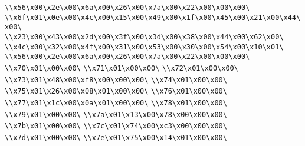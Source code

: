 \verb|\\x56\x00\x2e\x00\x6a\x00\x26\x00\x7a\x00\x22\x00\x00\x00\|\newline
\verb|\\x6f\x01\x0e\x00\x4c\x00\x15\x00\x49\x00\x1f\x00\x45\x00\x21\x00\x44\x00\|\newline
\verb|\\x23\x00\x43\x00\x2d\x00\x3f\x00\x3d\x00\x38\x00\x44\x00\x62\x00\|\newline
\verb|\\x4c\x00\x32\x00\x4f\x00\x31\x00\x53\x00\x30\x00\x54\x00\x10\x01\|\newline
\verb|\\x56\x00\x2e\x00\x6a\x00\x26\x00\x7a\x00\x22\x00\x00\x00\|\newline
\verb|\\x70\x01\x00\x00\|\newline
\verb|\\x71\x01\x00\x00\|\newline
\verb|\\x72\x01\x00\x00\|\newline
\verb|\\x73\x01\x48\x00\xf8\x00\x00\x00\|\newline
\verb|\\x74\x01\x00\x00\|\newline
\verb|\\x75\x01\x26\x00\x08\x01\x00\x00\|\newline
\verb|\\x76\x01\x00\x00\|\newline
\verb|\\x77\x01\x1c\x00\x0a\x01\x00\x00\|\newline
\verb|\\x78\x01\x00\x00\|\newline
\verb|\\x79\x01\x00\x00\|\newline
\verb|\\x7a\x01\x13\x00\x78\x00\x00\x00\|\newline
\verb|\\x7b\x01\x00\x00\|\newline
\verb|\\x7c\x01\x74\x00\xc3\x00\x00\x00\|\newline
\verb|\\x7d\x01\x00\x00\|\newline
\verb|\\x7e\x01\x75\x00\x14\x01\x00\x00\|\newline
